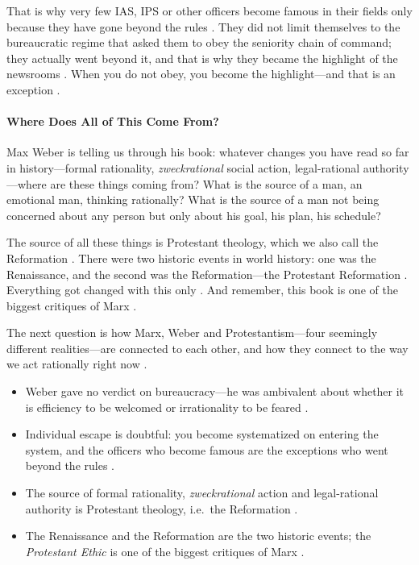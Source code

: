 That is why very few IAS, IPS or other officers become famous in their fields only because they have gone beyond the rules . They did not limit themselves to the bureaucratic regime that asked them to obey the seniority chain of command; they actually went beyond it, and that is why they became the highlight of the newsrooms . When you do not obey, you become the highlight---and that is an exception .

\paragraph{Where Does All of This Come From?}
Max Weber is telling us through his book: whatever changes you have read so far in history---formal rationality, \textit{zweckrational} social action, legal-rational authority---where are these things coming from?  What is the source of a man, an emotional man, thinking rationally?  What is the source of a man not being concerned about any person but only about his goal, his plan, his schedule? 

\begin{KeyConcept}
The source of all these things is Protestant theology, which we also call the Reformation .
There were two historic events in world history: one was the Renaissance, and the second was the Reformation---the Protestant Reformation . Everything got changed with this only .
And remember, this book is one of the biggest critiques of Marx .
\end{KeyConcept}

The next question is how Marx, Weber and Protestantism---four seemingly different realities---are connected to each other, and how they connect to the way we act rationally right now .

\begin{QuickRevision}
\begin{itemize}
    \item Weber gave no verdict on bureaucracy---he was ambivalent about whether it is efficiency to be welcomed or irrationality to be feared .
    \item Individual escape is doubtful: you become systematized on entering the system, and the officers who become famous are the exceptions who went beyond the rules .
    \item The source of formal rationality, \textit{zweckrational} action and legal-rational authority is Protestant theology, i.e.\ the Reformation .
    \item The Renaissance and the Reformation are the two historic events; the \textit{Protestant Ethic} is one of the biggest critiques of Marx .
\end{itemize}
\end{QuickRevision}


